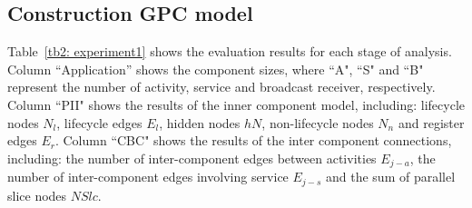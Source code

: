 \subsection{Construction GPC model}
Table~\ref{tb2: experiment1} shows the evaluation results for each stage of analysis. Column ``Application'' shows the component sizes, where ``A", ``S" and ``B" represent the number of activity, service and broadcast receiver, respectively. %
%
Column ``PII" shows the results of the inner component model, including: lifecycle nodes $N_{l}$, lifecycle edges $E_{l}$, hidden nodes $hN$, non-lifecycle nodes $N_{n}$ and register edges $E_{r}$. %
%
Column ``CBC" shows the results of the inter component connections, including: the number of inter-component edges between activities $E_{j-a}$, the number of inter-component edges involving service $E_{j-s}$ and the sum of parallel slice nodes $NSlc$. %

